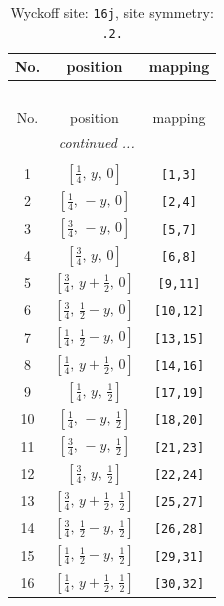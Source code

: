 \documentclass[fleqn,8pt]{jsarticle}
\begin{document}
\renewcommand{\arraystretch}{1.2}
\begin{longtable}{ccc}
\caption{Wyckoff site: {\tt 16j}, site symmetry: {\tt .2.}}
 \\
 \hline \hline
No. & position & mapping \\ \hline \endfirsthead

\multicolumn{2}{l}{\tablename\ \thetable{}} \\
 \hline \hline
No. & position & mapping \\ \hline \endhead

 \hline \hline
\multicolumn{2}{r}{\footnotesize\it continued ...} \\ \endfoot

 \hline \hline
\multicolumn{2}{r}{} \\ \endlastfoot

1 & $\left[ \frac{1}{4},\, y,\, 0 \right]$ & {\tt [1,3]} \\ \hline
2 & $\left[ \frac{1}{4},\, - y,\, 0 \right]$ & {\tt [2,4]} \\ \hline
3 & $\left[ \frac{3}{4},\, - y,\, 0 \right]$ & {\tt [5,7]} \\ \hline
4 & $\left[ \frac{3}{4},\, y,\, 0 \right]$ & {\tt [6,8]} \\ \hline
5 & $\left[ \frac{3}{4},\, y + \frac{1}{2},\, 0 \right]$ & {\tt [9,11]} \\ \hline
6 & $\left[ \frac{3}{4},\, \frac{1}{2} - y,\, 0 \right]$ & {\tt [10,12]} \\ \hline
7 & $\left[ \frac{1}{4},\, \frac{1}{2} - y,\, 0 \right]$ & {\tt [13,15]} \\ \hline
8 & $\left[ \frac{1}{4},\, y + \frac{1}{2},\, 0 \right]$ & {\tt [14,16]} \\ \hline
9 & $\left[ \frac{1}{4},\, y,\, \frac{1}{2} \right]$ & {\tt [17,19]} \\ \hline
10 & $\left[ \frac{1}{4},\, - y,\, \frac{1}{2} \right]$ & {\tt [18,20]} \\ \hline
11 & $\left[ \frac{3}{4},\, - y,\, \frac{1}{2} \right]$ & {\tt [21,23]} \\ \hline
12 & $\left[ \frac{3}{4},\, y,\, \frac{1}{2} \right]$ & {\tt [22,24]} \\ \hline
13 & $\left[ \frac{3}{4},\, y + \frac{1}{2},\, \frac{1}{2} \right]$ & {\tt [25,27]} \\ \hline
14 & $\left[ \frac{3}{4},\, \frac{1}{2} - y,\, \frac{1}{2} \right]$ & {\tt [26,28]} \\ \hline
15 & $\left[ \frac{1}{4},\, \frac{1}{2} - y,\, \frac{1}{2} \right]$ & {\tt [29,31]} \\ \hline
16 & $\left[ \frac{1}{4},\, y + \frac{1}{2},\, \frac{1}{2} \right]$ & {\tt [30,32]} \\
\end{longtable}
\end{document}
